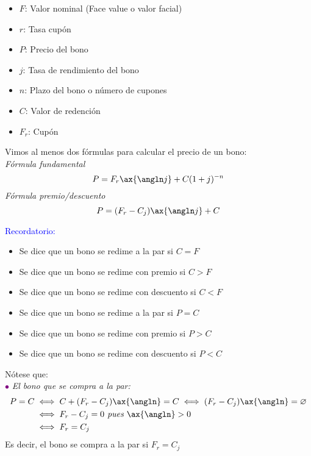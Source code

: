 \begin{center}
\begin{tikzpicture}[x=0.75pt,y=0.75pt,yscale=-1,xscale=1]
\end{tikzpicture}

\end{center}

\begin{itemize}
    \item[ ] $F$: Valor nominal (Face value o valor facial)
    \item[ ] $r$: Tasa cupón
    \item[ ] $P$: Precio del bono
    \item[ ] $j$: Tasa de rendimiento del bono
    \item[ ] $n$: Plazo del bono o número de cupones
    \item[ ] $C$: Valor de redención
    \item[ ] $F_r$: Cupón
\end{itemize}

Vimos al menos dos fórmulas para calcular el precio de un bono:\\
\textit{Fórmula fundamental}
$$P=F_r\ax{\angln j} + C(1+j)^{-n}$$
\textit{Fórmula premio/descuento}
$$P=(F_r-C_j) \ax{\angln j} + C$$

\textcolor{blue}{Recordatorio:}
\begin{definition}
\begin{itemize}
    \item Se dice que un bono se redime a la par si $C=F$
    \item Se dice que un bono se redime con premio si $C>F$
    \item Se dice que un bono se redime con descuento si $C<F$
    \item Se dice que un bono se redime a la par si $P=C$
    \item Se dice que un bono se redime con premio si $P>C$
    \item Se dice que un bono se redime con descuento si $P<C$
\end{itemize}
\end{definition}

Nótese que:\\
\textcolor{purple}{$\bullet$}\textit{ El bono que se compra a la par:}
\begin{align*}
    P=C &\iff C+(F_r-C_j)\ax{\angln} =C \iff (F_r-C_j)\ax{\angln} = \varnothing\\
    &\iff F_r-C_j=0\textit{ pues } \ax{\angln}>0\\
    &\iff F_r=C_j
\end{align*}
Es decir, el bono se compra a la par si $F_r=C_j$

